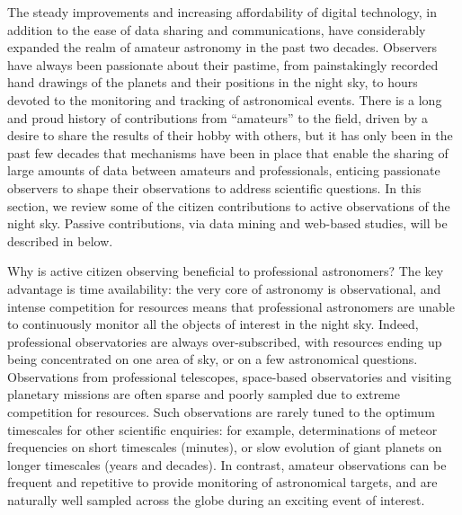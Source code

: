 \documentclass{ar2e}
\begin{document}


The steady improvements and increasing affordability of digital technology, in
addition to the ease of data sharing and communications, have considerably
expanded the realm of amateur astronomy in the past two decades.  Observers have
always been passionate about their pastime, from painstakingly recorded hand
drawings of the planets and their positions in the night sky, to hours devoted
to the monitoring and tracking of astronomical events.  There is a long and
proud history of contributions from ``amateurs'' to the field, driven by a
desire to share the results of their hobby with others, but it has only been in
the past few decades that mechanisms have been in place that enable the sharing
of large amounts of data between amateurs and professionals, enticing passionate
observers to shape their observations to address scientific questions.  In this
section, we review some of the citizen contributions to active observations of
the night sky.  Passive contributions, via data mining and web-based studies,
will be described in  below.

Why is active citizen observing beneficial to professional astronomers? 
The key advantage is time availability: the very core of astronomy is
observational, and intense competition for resources means that professional
astronomers are unable to continuously monitor all the objects of interest in
the night sky.  Indeed, professional observatories are always over-subscribed,
with resources ending up being concentrated on one area of sky, or on a few
astronomical questions.  Observations from professional telescopes, space-based
observatories and visiting planetary missions are often sparse and poorly
sampled due to extreme competition for resources.  Such observations are rarely
tuned to the optimum timescales for other scientific enquiries: for example,
determinations of meteor frequencies on short timescales (minutes), or slow
evolution of giant planets on longer timescales (years and decades).  In
contrast, amateur observations can be frequent and repetitive to provide
monitoring of astronomical targets, and are naturally well sampled across the
globe during an exciting event of interest. 
\end{document}
